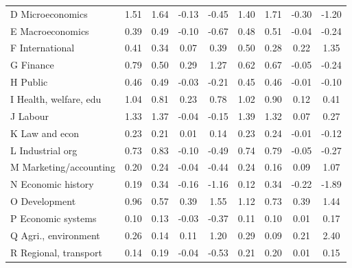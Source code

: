 \begin{table}[H]
\begin{adjustwidth}{-0.6cm}{}
\begin{threeparttable}
\begin{tabular}{p{3.55cm}S@{}S@{}S@{}S@{}S@{}S@{}S@{}S@{}}
            \quad D Microeconomics&        1.51&        1.64&       -0.13&       -0.45&        1.40&        1.71&       -0.30&       -1.20\\
            \quad E Macroeconomics&        0.39&        0.49&       -0.10&       -0.67&        0.48&        0.51&       -0.04&       -0.24\\
            \quad F International&        0.41&        0.34&        0.07&        0.39&        0.50&        0.28&        0.22&        1.35\\
            \quad G Finance     &        0.79&        0.50&        0.29&        1.27&        0.62&        0.67&       -0.05&       -0.24\\
            \quad H Public      &        0.46&        0.49&       -0.03&       -0.21&        0.45&        0.46&       -0.01&       -0.10\\
            \quad I Health, welfare, edu&        1.04&        0.81&        0.23&        0.78&        1.02&        0.90&        0.12&        0.41\\
            \quad J Labour      &        1.33&        1.37&       -0.04&       -0.15&        1.39&        1.32&        0.07&        0.27\\
            \quad K Law and econ&        0.23&        0.21&        0.01&        0.14&        0.23&        0.24&       -0.01&       -0.12\\
            \quad L Industrial org&        0.73&        0.83&       -0.10&       -0.49&        0.74&        0.79&       -0.05&       -0.27\\
            \quad M Marketing/accounting&        0.20&        0.24&       -0.04&       -0.44&        0.24&        0.16&        0.09&        1.07\\
            \quad N Economic history&        0.19&        0.34&       -0.16&       -1.16&        0.12&        0.34&       -0.22&       -1.89\\
            \quad O Development &        0.96&        0.57&        0.39&        1.55&        1.12&        0.73&        0.39&        1.44\\
            \quad P Economic systems&        0.10&        0.13&       -0.03&       -0.37&        0.11&        0.10&        0.01&        0.17\\
            \quad Q Agri., environment&        0.26&        0.14&        0.11&        1.20&        0.29&        0.09&        0.21&        2.40\\
            \quad R Regional, transport&        0.14&        0.19&       -0.04&       -0.53&        0.21&        0.20&        0.01&        0.15\\

\end{tabular}
\end{threeparttable}
\end{adjustwidth}
\end{table}
